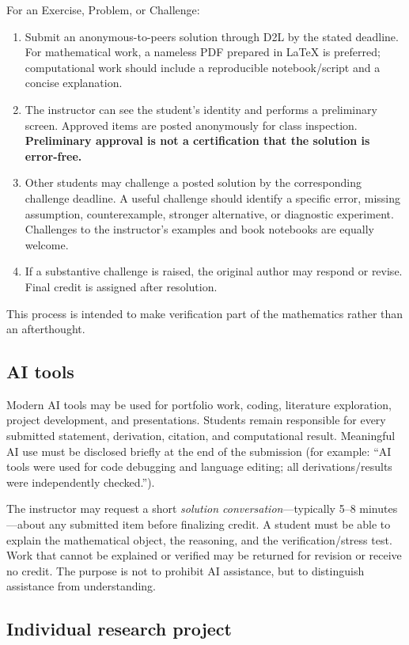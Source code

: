 \documentclass[11pt]{article}
\begin{document}
For an Exercise, Problem, or Challenge:
\begin{enumerate}
\item Submit an anonymous-to-peers solution through D2L by the stated deadline. For mathematical work, a nameless PDF prepared in LaTeX is preferred; computational work should include a reproducible notebook/script and a concise explanation.
\item The instructor can see the student's identity and performs a preliminary screen. Approved items are posted anonymously for class inspection. \textbf{Preliminary approval is not a certification that the solution is error-free.}
\item Other students may challenge a posted solution by the corresponding challenge deadline. A useful challenge should identify a specific error, missing assumption, counterexample, stronger alternative, or diagnostic experiment. Challenges to the instructor's examples and book notebooks are equally welcome.
\item If a substantive challenge is raised, the original author may respond or revise. Final credit is assigned after resolution.
\end{enumerate}

This process is intended to make verification part of the mathematics rather than an afterthought.

\subsection*{AI tools}

Modern AI tools may be used for portfolio work, coding, literature exploration, project development, and presentations. Students remain responsible for every submitted statement, derivation, citation, and computational result. Meaningful AI use must be disclosed briefly at the end of the submission (for example: ``AI tools were used for code debugging and language editing; all derivations/results were independently checked.'').

The instructor may request a short \emph{solution conversation}---typically 5--8 minutes---about any submitted item before finalizing credit. A student must be able to explain the mathematical object, the reasoning, and the verification/stress test. Work that cannot be explained or verified may be returned for revision or receive no credit. The purpose is not to prohibit AI assistance, but to distinguish assistance from understanding.

\subsection*{Individual research project}
\end{document}
